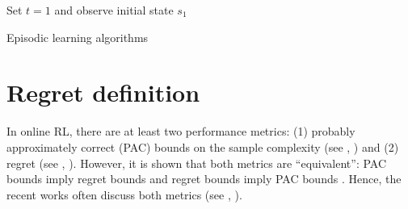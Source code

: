 \begin{algorithm}[ht]
    \DontPrintSemicolon
    \BlankLine
    Set $t=1$ and observe initial state $s_1$ \;
    \caption{Episodic learning algorithms}
    \label{algo:generics}
\end{algorithm}



%

\section{Regret definition}

In online RL, there are at least two performance metrics: (1) probably approximately correct (PAC) bounds on the sample complexity (see \eg, \cite{brafman2002r, kearns2002near, kakade2003sample, dann2015sample, jiang2018open, wang2020long}) and (2) regret (see \eg, \cite{jaksch2010near, osband2013more, azar2017minimax, jin2018q, zanette2019tighter, zhang2019regret}).
However, it is shown that both metrics are ``equivalent'': PAC bounds imply regret bounds and regret bounds imply PAC bounds \cite{osband2016deep}.
Hence, the recent works often discuss both metrics (see \eg, \cite{he2021nearly, zhang2021reinforcement}).

